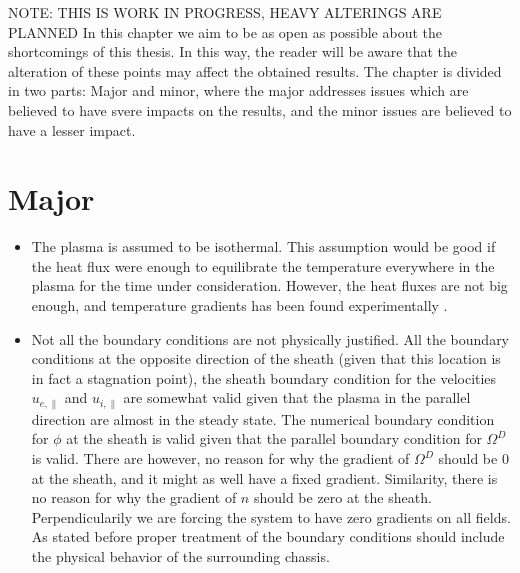 NOTE: THIS IS WORK IN PROGRESS, HEAVY ALTERINGS ARE PLANNED
In this chapter we aim to be as open as possible about the shortcomings of this thesis.
In this way, the reader will be aware that the alteration of these points may affect the obtained results.
The chapter is divided in two parts: Major and minor, where the major addresses issues which are believed to have svere impacts on the results, and the minor issues are believed to have a lesser impact.

\section{Major}
\begin{itemize}[noitemsep,nolistsep]
    \item The plasma is assumed to be isothermal.
        This assumption would be good if the heat flux were enough to equilibrate the temperature everywhere in the plasma for the time under consideration.
        However, the heat fluxes are not big enough, and temperature gradients has been found experimentally \cite{Schroder2003Phd}.
    \item Not all the boundary conditions are not physically justified.
        All the boundary conditions at the opposite direction of the sheath (given that this location is in fact a stagnation point), the sheath boundary condition for the velocities $u_{e,\|}$ and $u_{i,\|}$ are somewhat valid given that the plasma in the parallel direction are almost in the steady state.
        The numerical boundary condition for $\phi$ at the sheath is valid given that the parallel boundary condition for $\Omega^D$ is valid.
        There are however, no reason for why the gradient of $\Omega^D$ should be $0$ at the sheath, and it might as well have a fixed gradient.
        Similarity, there is no reason for why the gradient of $n$ should be zero at the sheath.
        Perpendicularily we are forcing the system to have zero gradients on all fields.
        As stated before proper treatment of the boundary conditions should include the physical behavior of the surrounding chassis.
\end{itemize}



